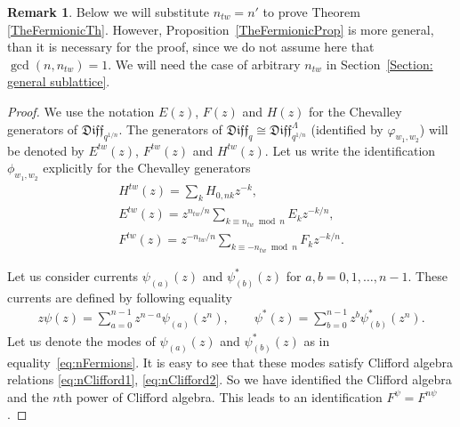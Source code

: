 \documentclass[pdftex]{sigma}
\numberwithin{equation}{section}
\theoremstyle{definition}
\newtheorem{Remark}[Theorem]{Remark}
\newcommand{\qD}{\mathfrak{Diff}_q}
\newcommand{\psia}{\psi_{({a})}}
\newcommand{\psib}{\psi^*_{( b )}}
\begin{document}
\begin{Remark}
Below we will substitute $n_{tw}=n'$ to prove Theorem \ref{TheFermionicTh}. However, Proposi\-tion~\ref{TheFermionicProp} is more general, than it is necessary for the proof, since we do not assume here that $\gcd(n, n_{tw})=1$. We will need the case of arbitrary $n_{tw}$ in Section~\ref{Section: general sublattice}.
\end{Remark}

\begin{proof}
We use the notation $E(z)$, $F(z)$ and $H(z)$ for the Chevalley generators of $\mathfrak{Diff}_{q^{1/n}}$. The generators of $\qD \cong \mathfrak{Diff}_{q^{1/n}}^{\Lambda}$ (identified by $\varphi_{w_1,w_2}$) will be denoted by $E^{tw}(z)$, $F^{tw}(z)$ and $H^{tw} (z)$. Let us write the identification $\phi_{w_1,w_2}$ explicitly for the Chevalley generators
\begin{gather}
H^{tw}(z) = \sum_k H_{ 0, nk} z^{-k}, \label{eq: tw chevalleyH}\\
E^{tw}(z) = z^{n_{tw}/n} \sum_{k \equiv n_{tw} \bmod n} E_{k} z^{-k/n}, \\
F^{tw}(z) = z^{-n_{tw}/n} \sum_{k \equiv -n_{tw} \bmod n} F_{ k} z^{-k/n} .\label{eq: tw chevalleyF}
\end{gather}

Let us consider currents $\psia (z)$ and $\psib (z)$ for $a,b = 0, 1, \dots, n-1$. These currents are defined by following equality
\begin{gather}
z \psi(z) = \sum_{a=0}^{n-1} z^{n-a} \psia (z^n) , \qquad
\psi^*(z) = \sum_{b=0}^{n-1} z^{b} \psib (z^n).\label{defa1}
\end{gather}
Let us denote the modes of $\psia (z)$ and $\psib (z)$ as in equality~\eqref{eq:nFermions}. It is easy to see that these modes satisfy Clifford algebra relations \eqref{eq:nClifford1}, \eqref{eq:nClifford2}. So we have identified the Clifford algebra and the $n$th power of Clifford algebra. This leads to an identification $F^{\psi}=F^{n \psi}$.


\end{proof}
\end{document}
